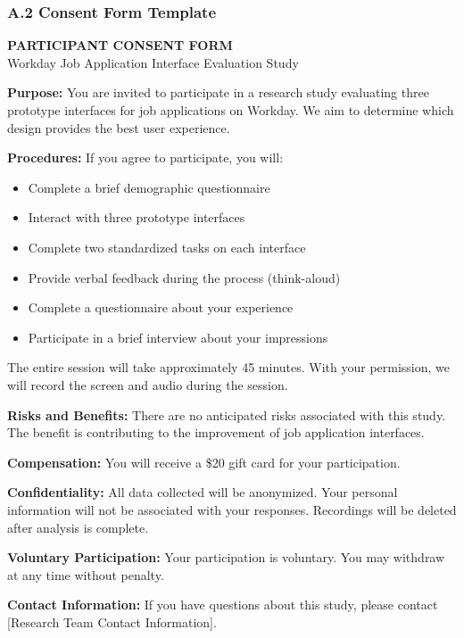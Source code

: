 \documentclass[
	letterpaper, %
]{jdf}
\begin{document}
\begin{sloppypar}
\subsubsection{A.2 Consent Form Template}

\begin{center}
\textbf{PARTICIPANT CONSENT FORM}\\
Workday Job Application Interface Evaluation Study
\end{center}

\textbf{Purpose:} You are invited to participate in a research study evaluating three prototype interfaces for job applications on Workday. We aim to determine which design provides the best user experience.

\textbf{Procedures:} If you agree to participate, you will:
\begin{itemize}
    \item Complete a brief demographic questionnaire
    \item Interact with three prototype interfaces
    \item Complete two standardized tasks on each interface
    \item Provide verbal feedback during the process (think-aloud)
    \item Complete a questionnaire about your experience
    \item Participate in a brief interview about your impressions
\end{itemize}

The entire session will take approximately 45 minutes. With your permission, we will record the screen and audio during the session.

\textbf{Risks and Benefits:} There are no anticipated risks associated with this study. The benefit is contributing to the improvement of job application interfaces.

\textbf{Compensation:} You will receive a \$20 gift card for your participation.

\textbf{Confidentiality:} All data collected will be anonymized. Your personal information will not be associated with your responses. Recordings will be deleted after analysis is complete.

\textbf{Voluntary Participation:} Your participation is voluntary. You may withdraw at any time without penalty.

\textbf{Contact Information:} If you have questions about this study, please contact [Research Team Contact Information].


\end{sloppypar}
\end{document}
